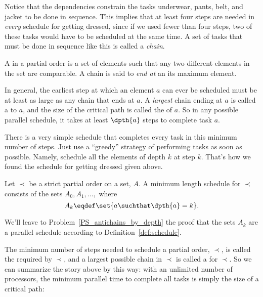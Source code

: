 Notice that the dependencies constrain the tasks underwear, pants,
belt, and jacket to be done in sequence.  This implies
that at least four steps are needed in \emph{every} schedule for
getting dressed, since if we used fewer than four steps, two of these
tasks would have to be scheduled at the same time.  A set of tasks
that must be done in sequence like this is called a \emph{chain}.

\begin{definition}
A  in a partial order is a set of elements such that any
two different elements in the set are comparable.  A chain is said to
\emph{end at} an its maximum element.
\end{definition}

In general, the earliest step at which an element $a$ can ever be
scheduled must be at least as large as any chain that ends at $a$.  A
\emph{largest} chain ending at $a$ is called a  to
$a$, and the size of the critical path is called the  of
$a$.  So in any possible parallel schedule, it takes at least
$\dpth{a}$ steps to complete task $a$.

There is a very simple schedule that completes every task in this
minimum number of steps.  Just use a ``greedy'' strategy of performing
tasks as soon as possible.  Namely, schedule all the elements of depth
$k$ at step $k$.  That's how we found the schedule for getting dressed
given above.

\iffalse

 For getting dressed, here is a picture of the
schedule obtained in this way:

\begin{center}\texttt{[image: figures/clothesparallel.mps]}\end{center}
\fi

\begin{theorem}\label{thm:parallel-time}
Let $\prec$ be a strict partial order on a set, $A$.  A minimum length
schedule for $\prec$ consists of the sets $A_0, A_1,\dots,$
where
\[
A_k \eqdef \set{a \suchthat \dpth{a} =k}.
\]
\end{theorem}

We'll leave to Problem~\ref{PS_antichains_by_depth} the proof that the
sets $A_k$ are a parallel schedule according to
Definition~\ref{def:schedule}.

The minimum number of steps needed to schedule a partial order,
$\prec$, is called the  required by $\prec$, and a
largest possible chain in $\prec$ is called a  for
$\prec$.  So we can summarize the story above by this way: with an
unlimited number of processors, the minimum parallel time to complete
all tasks is simply the size of a critical path:

